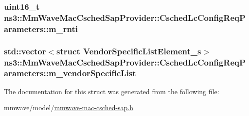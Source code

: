 \subsubsection[{\texorpdfstring{m\+\_\+rnti}{m_rnti}}]{\setlength{\rightskip}{0pt plus 5cm}uint16\+\_\+t ns3\+::\+Mm\+Wave\+Mac\+Csched\+Sap\+Provider\+::\+Csched\+Lc\+Config\+Req\+Parameters\+::m\+\_\+rnti}\hypertarget{structns3_1_1MmWaveMacCschedSapProvider_1_1CschedLcConfigReqParameters_aa80c0915a4e36dfef7de5bda0e998314}{}\label{structns3_1_1MmWaveMacCschedSapProvider_1_1CschedLcConfigReqParameters_aa80c0915a4e36dfef7de5bda0e998314}
\subsubsection[{\texorpdfstring{m\+\_\+vendor\+Specific\+List}{m_vendorSpecificList}}]{\setlength{\rightskip}{0pt plus 5cm}std\+::vector$<$struct {\bf Vendor\+Specific\+List\+Element\+\_\+s}$>$ ns3\+::\+Mm\+Wave\+Mac\+Csched\+Sap\+Provider\+::\+Csched\+Lc\+Config\+Req\+Parameters\+::m\+\_\+vendor\+Specific\+List}\hypertarget{structns3_1_1MmWaveMacCschedSapProvider_1_1CschedLcConfigReqParameters_a51e61919e1fbceaa2c9af8383d469f8a}{}\label{structns3_1_1MmWaveMacCschedSapProvider_1_1CschedLcConfigReqParameters_a51e61919e1fbceaa2c9af8383d469f8a}


The documentation for this struct was generated from the following file\+:\begin{DoxyCompactItemize}
\item 
mmwave/model/\hyperlink{mmwave-mac-csched-sap_8h}{mmwave-\/mac-\/csched-\/sap.\+h}\end{DoxyCompactItemize}

